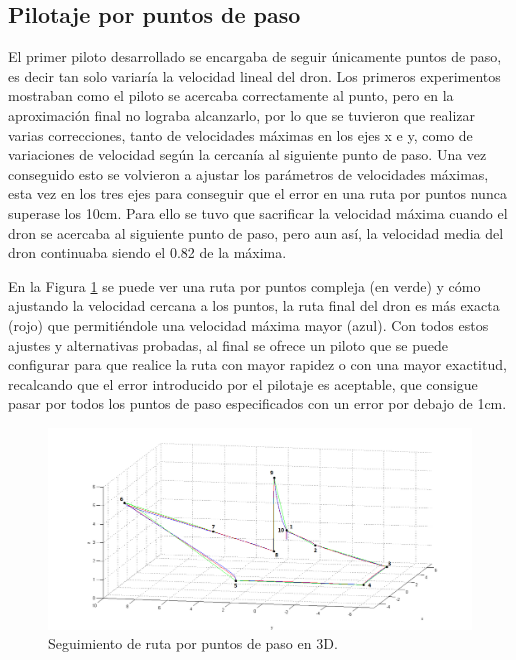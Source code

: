\subsection{Pilotaje por puntos de paso}
\hspace{1cm} El primer piloto desarrollado se encargaba de seguir únicamente puntos de paso, es decir tan solo variaría la velocidad lineal del dron. Los primeros experimentos mostraban como el piloto se acercaba correctamente al punto, pero en la aproximación final no lograba alcanzarlo, por lo que se tuvieron que realizar varias correcciones, tanto de velocidades máximas en los ejes x e y, como de variaciones de velocidad según la cercanía al siguiente punto de paso. Una vez conseguido esto se volvieron a ajustar los parámetros de velocidades máximas, esta vez en los tres ejes para conseguir que el error en una ruta por puntos nunca superase los 10cm. Para ello se tuvo que sacrificar la velocidad máxima cuando el dron se acercaba al siguiente punto de paso, pero aun así, la velocidad media del dron continuaba siendo el 0.82 de la máxima.

\hspace{1cm} En la Figura \ref{fig:Error asociado al pilotaje.} se puede ver una ruta por puntos compleja (en verde) y cómo ajustando la velocidad cercana a los puntos, la ruta final del dron es más exacta (rojo) que permitiéndole una velocidad máxima mayor (azul). Con todos estos ajustes y alternativas probadas, al final se ofrece un piloto que se puede configurar para que realice la ruta con mayor rapidez o con una mayor exactitud, recalcando que el error introducido por el pilotaje es aceptable, que consigue pasar por todos los puntos de paso especificados con un error por debajo de 1cm.

\begin{figure}[H]
	\begin{center}
		\includegraphics[width=1.1\textwidth]{imag/IMG47.png}
				\caption{Seguimiento de ruta por puntos de paso en 3D.}
		\label{fig:Error asociado al pilotaje.}	
	\end{center}
\end{figure}

